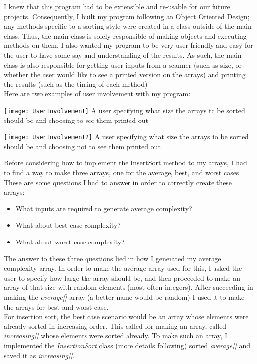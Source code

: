 \documentclass[12pt]{article}
\begin{document}
I knew that this program had to be extensible and re-usable for our future projects. Consequently, I built my program following an Object Oriented Design; any methods specific to a sorting style were created in a class outside of the main class. Thus, the main class is solely responsible of making objects and executing methods on them. I also wanted my program to be very user friendly and easy for the user to have some say and understanding of the results. As such, the main class is also responsible for getting user inputs from a scanner (such as size, or whether the user would like to see a printed version on the arrays) and printing the results (such as the timing of each method)\\

Here are two examples of user involvement with my program:

\texttt{[image: UserInvolvement]}
A user specifying what size the arrays to be sorted should be and choosing to see them printed out

\vspace*{.5in}
\texttt{[image: UserInvolvement2]}
A user specifying what size the arrays to be sorted should be and choosing not to see them printed out
\vspace*{.5in}

Before considering how to implement the InsertSort method to my arrays, I had to find a way to make three arrays, one for the average, best, and worst cases. These are some questions I had to answer in order to correctly create these arrays:

\begin{itemize}
	\item What inputs are required to generate average complexity?
	\item What about best-case complexity?
	\item What about worst-case complexity?
\end{itemize}

The answer to these three questions lied in how I generated my average complexity array. In order to make the average array used for this, I asked the user to specify how large the array should be, and then proceeded to make an array of that size with random elements (most often integers).
After succeeding in making the \textit{average[]} array (a better name would be random) I used it to make the arrays for best and worst case. \\

For insertion sort, the best case scenario would be an array whose elements were already sorted in increasing order. This called for making an array, called \textit{increasing[]} whose elements were sorted already. To make such an array, I implemented the \textit{InsertionSort} class (more details following) sorted \textit{average[]} and saved it as \textit{increasing[]}.\\
\end{document}
